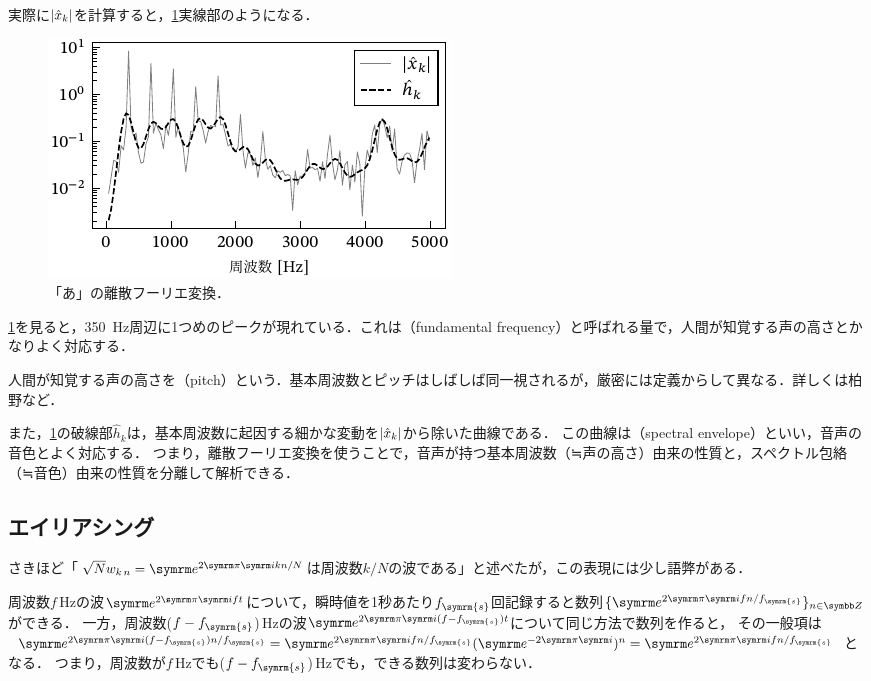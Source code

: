 \documentclass[../../main]{subfiles}
\begin{document}
実際に\(\lvert\hat{x}_k\rvert\)を計算すると，\cref{figure:frequency_domain}実線部のようになる．

\begin{figure}[htbp]
  \centering
  \includegraphics{figures/frequency_domain.pdf}
  \caption{「あ」の離散フーリエ変換．}
  \label{figure:frequency_domain}
\end{figure}

\cref{figure:frequency_domain}を見ると，\SI{350}{Hz}周辺に1つめのピークが現れている．これは（fundamental frequency）と呼ばれる量で，人間が知覚する声の高さとかなりよく対応する．

\begin{note}
  人間が知覚する声の高さを（pitch）という．基本周波数とピッチはしばしば同一視されるが，厳密には定義からして異なる．詳しくは柏野\cite{kashino}など．
\end{note}

また，\cref{figure:frequency_domain}の破線部\(\hat{h}_k\)は，基本周波数に起因する細かな変動を\(\lvert\hat{x}_k\rvert\)から除いた曲線である．
この曲線は（spectral envelope）といい，音声の音色とよく対応する．
つまり，離散フーリエ変換を使うことで，音声が持つ基本周波数（≒声の高さ）由来の性質と，スペクトル包絡（≒音色）由来の性質を分離して解析できる．

\subsection{エイリアシング}

さきほど「\(\sqrt{N}\midx{w}{k}{n}=\napr^{2\krez\iuni kn/N}\)は周波数\(k/N\)の波である」と述べたが，この表現には少し語弊がある．

周波数\(f\)\,\si{Hz}の波\(\napr^{2\krez\iuni ft}\)について，瞬時値を1秒あたり\(f_{\symrm{s}}\)回記録すると数列\(\seq{\napr^{2\krez\iuni fn/f_{\symrm{s}}}}_{n\in\numset{Z}}\)ができる．
一方，周波数(\(f-f_{\symrm{s}}\))\,\si{Hz}の波\(\napr^{2\krez\iuni(f-f_{\symrm{s}})t}\)について同じ方法で数列を作ると，
その一般項は\(\napr^{2\krez\iuni(f-f_{\symrm{s}})n/f_{\symrm{s}}}=\napr^{2\krez\iuni fn/f_{\symrm{s}}}(\napr^{-2\krez\iuni})^n=\napr^{2\krez\iuni fn/f_{\symrm{s}}}\)となる．
つまり，周波数が\(f\)\,\si{Hz}でも(\(f-f_{\symrm{s}}\))\,\si{Hz}でも，できる数列は変わらない．
\end{document}
